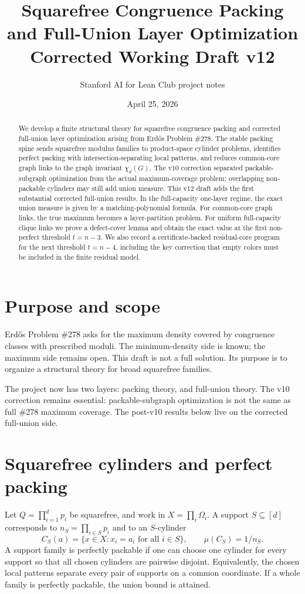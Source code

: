 \documentclass[11pt]{article}
\title{Squarefree Congruence Packing and Full-Union Layer Optimization\\Corrected Working Draft v12}
\author{Stanford AI for Lean Club project notes}
\date{April 25, 2026}
\begin{document}
\maketitle
\begin{abstract}
We develop a finite structural theory for squarefree congruence packing and corrected full-union layer optimization arising from Erd\H{o}s Problem \#278. The stable packing spine sends squarefree modulus families to product-space cylinder problems, identifies perfect packing with intersection-separating local patterns, and reduces common-core graph links to the graph invariant $\chi_d(G)$. The v10 correction separated packable-subgraph optimization from the actual maximum-coverage problem: overlapping non-packable cylinders may still add union measure. This v12 draft adds the first substantial corrected full-union results. In the full-capacity one-layer regime, the exact union measure is given by a matching-polynomial formula. For common-core graph links, the true maximum becomes a layer-partition problem. For uniform full-capacity clique links we prove a defect-cover lemma and obtain the exact value at the first non-perfect threshold $t=n-3$. We also record a certificate-backed residual-core program for the next threshold $t=n-4$, including the key correction that empty colors must be included in the finite residual model.
\end{abstract}

\section{Purpose and scope}
Erd\H{o}s Problem \#278 asks for the maximum density covered by congruence classes with prescribed moduli. The minimum-density side is known; the maximum side remains open. This draft is not a full solution. Its purpose is to organize a structural theory for broad squarefree families.

The project now has two layers: packing theory, and full-union theory. The v10 correction remains essential: packable-subgraph optimization is not the same as full \#278 maximum coverage. The post-v10 results below live on the corrected full-union side.

\section{Squarefree cylinders and perfect packing}
Let $Q=\prod_{i=1}^d p_i$ be squarefree, and work in $X=\prod_i\Omega_i$. A support $S\subseteq[d]$ corresponds to $n_S=\prod_{i\in S}p_i$ and to an $S$-cylinder
\[
C_S(a)=\{x\in X:x_i=a_i\text{ for all }i\in S\},\qquad \mu(C_S)=1/n_S.
\]
A support family is perfectly packable if one can choose one cylinder for every support so that all chosen cylinders are pairwise disjoint. Equivalently, the chosen local patterns separate every pair of supports on a common coordinate. If a whole family is perfectly packable, the union bound is attained.
\end{document}
